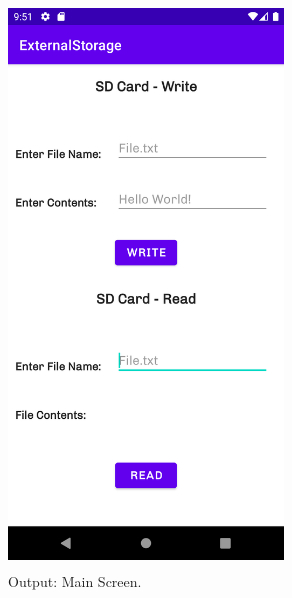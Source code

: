 \documentclass[12pt, a4]{article}
\begin{document}
\newpage
\subsection*{}
\begin{figure}[h]
\centering
\caption{Output: Main Screen.}
\includegraphics[height=15cm, width=7.3cm]{ExternalStorage/Screenshots/Output-1.png}
\end{figure}

\newpage
\end{document}
